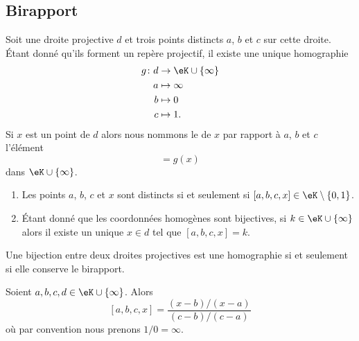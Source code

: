 \subsection{Birapport}

Soit une droite projective \( d\) et trois points distincts \( a\), \( b\) et \( c\) sur cette droite. Étant donné qu'ils forment un repère projectif, il existe une unique homographie 
\begin{equation}
    \begin{aligned}
        g\colon d&\to \eK\cup\{ \infty \} \\
        a&\mapsto \infty \\
        b&\mapsto 0 \\
        c&\mapsto 1. 
    \end{aligned}
\end{equation}
Si \( x\) est un point de \( d\) alors nous nommons le  de \( x\) par rapport à \( a\), \( b\) et \( c\) l'élément
\begin{equation}
    [a,b,c,x]=g(x)
\end{equation}
dans \( \eK\cup\{ \infty \}\).
\begin{enumerate}
    \item
        Les points \( a\), \( b\), \( c\) et \( x\) sont distincts si et seulement si \( [a,b,c,x]\in \eK\setminus\{ 0,1 \}\).
    \item
        Étant donné que les coordonnées homogènes sont bijectives, si \( k\in \eK\cup\{ \infty \}\) alors il existe un unique \( x\in d\) tel que \( [a,b,c,x]=k\).
\end{enumerate}

\begin{theorem}
    Une bijection entre deux droites projectives est une homographie si et seulement si elle conserve le birapport.
\end{theorem}

\begin{proposition}
    Soient \( a,b,c,d\in \eK\cup\{ \infty \}\). Alors
    \begin{equation}        \label{EqIYLFEJ}
        [a,b,c,x]=\frac{ (x-b)/(x-a) }{ (c-b)/(c-a) }
    \end{equation}
    où par convention nous prenons \( 1/0=\infty\).
\end{proposition}

